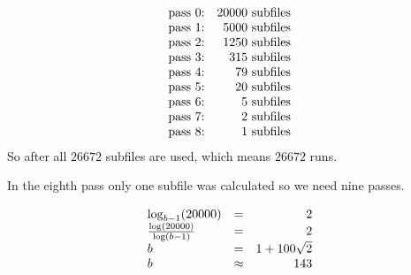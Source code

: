 \begin{exercise}{4}

\begin{subexercise}
  \begin{displaymath}
    \begin{array}{l r}
    \text{pass 0:}& 20000 \text{ subfiles}\\
    \text{pass 1:}& 5000 \text{ subfiles}\\
    \text{pass 2:}& 1250 \text{ subfiles}\\
    \text{pass 3:}& 315 \text{ subfiles}\\
    \text{pass 4:}& 79 \text{ subfiles}\\
    \text{pass 5:}& 20 \text{ subfiles}\\
    \text{pass 6:}& 5 \text{ subfiles}\\
    \text{pass 7:}& 2 \text{ subfiles}\\
    \text{pass 8:}& 1 \text{ subfiles}\\
    \end{array}
  \end{displaymath}
  So after all $26672$ subfiles are used, which means $26672$ runs.

\end{subexercise}

\begin{subexercise}
  In the eighth pass only one subfile was calculated so we need nine passes.
\end{subexercise}

\begin{subexercise}
  \begin{displaymath}
    \begin{array}{l c r}
      \log_{b-1}(20000) & = & 2\\
      \frac{\log(20000)}{\log(b-1)}&=&2 \\
      b &= &1 + 100 \sqrt{2} \\
      b &\approx& 143
    \end{array}
  \end{displaymath}
\end{subexercise}


\end{exercise}
